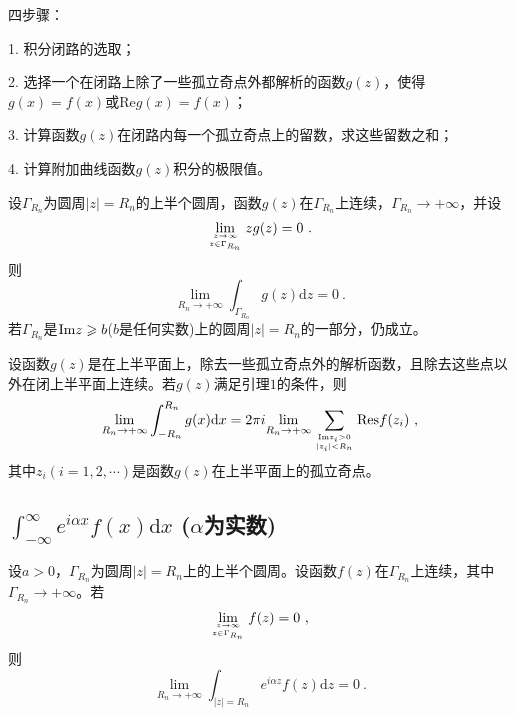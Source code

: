 \documentclass[12pt,a4paper]{article}
\newcommand{\dif}{\mathrm{d}}
\begin{document}
四步骤：

1. 积分闭路的选取；

2. 选择一个在闭路上除了一些孤立奇点外都解析的函数$g(z)$，使得$g(x)=f(x)$或$\text{Re} g(x) = f(x)$；

3. 计算函数$g(z)$在闭路内每一个孤立奇点上的留数，求这些留数之和；

4. 计算附加曲线函数$g(z)$积分的极限值。




\begin{tcolorbox}[colback=green!5,colframe=green!40!black,title= 引理 1]
设$\Gamma_{R_n}$为圆周$|z| = R_n$的上半个圆周，函数$g(z)$在$\Gamma_{R_n}$上连续，$\Gamma_{R_n} \rightarrow +\infty$，并设
\begin{equation*}
\lim\limits_{z\rightarrow \infty \atop z \in \Gamma_{R_n} } z g(z) = 0 ~.
\end{equation*}
则
\begin{equation*}
\underset{R_n\rightarrow +\infty}\lim \int_{\Gamma_{R_n}} g(z) \dif z = 0 ~.
\end{equation*}
若$\Gamma_{R_n}$是${\rm Im} z \geqslant b$($b$是任何实数)上的圆周$|z| = R_n$的一部分，仍成立。
\end{tcolorbox}


\begin{tcolorbox}[colback=green!5,colframe=green!40!black,title= Theorem 1]
设函数$g(z)$是在上半平面上，除去一些孤立奇点外的解析函数，且除去这些点以外在闭上半平面上连续。若$g(z)$满足引理$1$的条件，则
\begin{equation}
\underset{R_n\rightarrow +\infty}\lim \int_{-R_n}^{R_n} g(x) \dif x = 2\pi i \underset{R_n\rightarrow +\infty}\lim \sum_{{\rm Im} z_i > 0  \atop |z_i| < R_n }  {\rm Res} f(z_i) ~,
\end{equation}
其中$z_i (i = 1, 2, \cdots)$是函数$g(z)$在上半平面上的孤立奇点。
\end{tcolorbox}



\subsection{$\int_{-\infty}^{\infty} e^{i\alpha x} f(x) \dif x$ ($\alpha$为实数)}
\begin{tcolorbox}[colback=green!5,colframe=green!40!black,title= 约当引理]
设$a > 0$，$\Gamma_{R_n}$为圆周$|z| = R_n$上的上半个圆周。设函数$f(z)$在$\Gamma_{R_n}$上连续，其中$\Gamma_{R_n} \rightarrow +\infty$。若
\begin{equation}
\lim\limits_{z\rightarrow \infty \atop z \in \Gamma_{R_n} } f(z) = 0  ~,
\end{equation}
则
\begin{equation}
\lim\limits_{R_n \rightarrow +\infty} \int_{|z|=R_n} e^{i\alpha z} f(z) \dif z = 0  ~.
\end{equation}
\end{tcolorbox}
\end{document}
